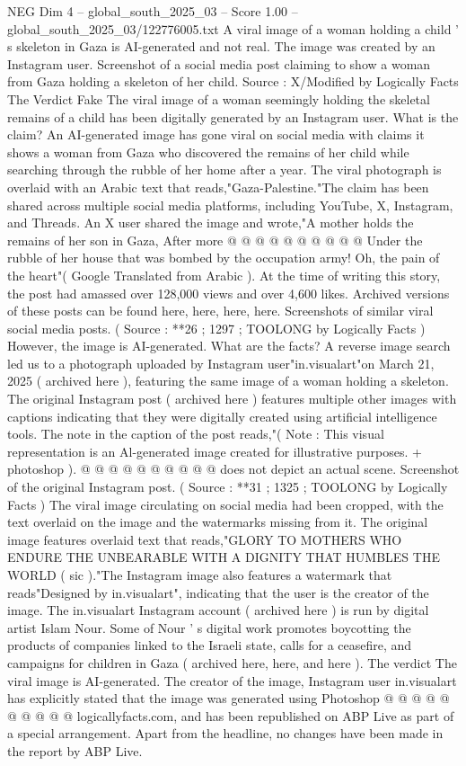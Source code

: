 \begin{textsample}{NEG Dim 4 – global\_south\_2025\_03 – Score 1.00 – global\_south\_2025\_03/122776005.txt}  \label{ex:f4_neg_430}
A viral image of a woman holding a child ' s skeleton in Gaza is AI-generated and not real.
The image was created by an Instagram user.
Screenshot of a social media post claiming to show a woman from Gaza holding a skeleton of her child.
Source : X/Modified by Logically Facts The Verdict Fake The viral image of a woman seemingly holding the skeletal remains of a child has been digitally generated by an Instagram user.
What is the claim?
An AI-generated image has gone viral on social media with claims it shows a woman from Gaza who discovered the remains of her child while searching through the rubble of her home after a year.
The viral photograph is overlaid with an Arabic text that reads,"Gaza-Palestine."The claim has been shared across multiple social media platforms, including YouTube, X, Instagram, and Threads.
An X user shared the image and wrote,"A mother holds the remains of her son in Gaza, After more @ @ @ @ @ @ @ @ @ @ Under the rubble of her house that was bombed by the occupation army!
Oh, the pain of the heart"( Google Translated from Arabic ).
At the time of writing this story, the post had amassed over 128,000 views and over 4,600 likes.
Archived versions of these posts can be found here, here, here, here.
Screenshots of similar viral social media posts. ( Source : **26 ; 1297 ; TOOLONG by Logically Facts ) However, the image is AI-generated.
What are the facts?
A reverse image search led us to a photograph uploaded by Instagram user"in.visualart"on March 21, 2025 ( archived here ), featuring the same image of a woman holding a skeleton.
The original Instagram post ( archived here ) features multiple other images with captions indicating that they were digitally created using artificial intelligence tools.
The note in the caption of the post reads,"( Note : This visual representation is an Al-generated image created for illustrative purposes. + photoshop ). @ @ @ @ @ @ @ @ @ @ does not depict an actual scene.
Screenshot of the original Instagram post. ( Source : **31 ; 1325 ; TOOLONG by Logically Facts ) The viral image circulating on social media had been cropped, with the text overlaid on the image and the watermarks missing from it.
The original image features overlaid text that reads,"GLORY TO MOTHERS WHO ENDURE THE UNBEARABLE WITH A DIGNITY THAT HUMBLES THE WORLD ( sic )."The Instagram image also features a watermark that reads"Designed by in.visualart", indicating that the user is the creator of the image.
The in.visualart Instagram account ( archived here ) is run by digital artist Islam Nour.
Some of Nour ' s digital work promotes boycotting the products of companies linked to the Israeli state, calls for a ceasefire, and campaigns for children in Gaza ( archived here, here, and here ).
The verdict The viral image is AI-generated.
The creator of the image, Instagram user in.visualart has explicitly stated that the image was generated using Photoshop @ @ @ @ @ @ @ @ @ @ logicallyfacts.com, and has been republished on ABP Live as part of a special arrangement.
Apart from the headline, no changes have been made in the report by ABP Live.

\end{textsample}
